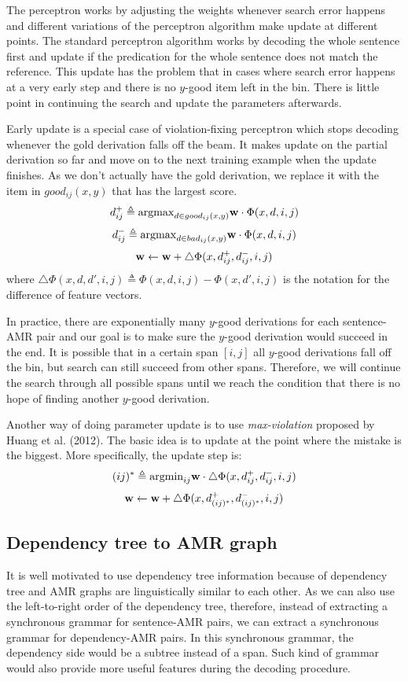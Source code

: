 The perceptron works by adjusting the weights whenever search error happens and different variations of the perceptron algorithm make update
at different points. The standard perceptron algorithm works by decoding the whole sentence first and update if the predication for the whole
sentence does not match the reference. This update has the problem that in cases where search error happens at a very early step and there is
no $y$-good item left in the bin. There is little point in continuing the search and update the parameters afterwards.


Early update is a special case of violation-fixing perceptron which stops decoding whenever the gold derivation falls off the beam. It makes update on the partial derivation so far and 
move on to the next training example when the update finishes. As we don't actually have the gold derivation, we replace it with
the item in $good_{ij}(x,y)$ that has the largest score.
$$d_{ij}^{+} \triangleq {\bf \argmax}_{d\in good_{ij}(x,y)} {\bf w}\cdot \Phi(x, d, i, j)$$
$$d_{ij}^{-} \triangleq {\bf \argmax}_{d\in bad_{ij}(x,y)} {\bf w}\cdot \Phi(x, d, i, j)$$
$${\bf w} \leftarrow {\bf w} + \triangle \Phi(x, d_{ij}^{+}, d_{ij}^{-}, i, j)$$
where $\triangle \Phi(x, d, d', i, j) \triangleq \Phi(x, d, i, j) - \Phi(x, d', i, j)$ is the notation for the difference of feature vectors.


In practice, there are exponentially many $y$-good derivations for each sentence-AMR pair and our goal is to make sure the $y$-good derivation would succeed in the end. 
It is possible that in a certain span $[i,j]$ all $y$-good derivations fall off the bin, but search can still succeed from other spans.
Therefore, we will continue the search through all possible spans until we reach the condition that there is no hope of finding another 
$y$-good derivation.


Another way of doing parameter update is to use \textit{max-violation} proposed by Huang et al. (2012). The basic idea is to update at the
point where the mistake is the biggest. More specifically, the update step is:
$$(ij)^{*} \triangleq {\argmin}_{ij} {\bf w} \cdot \triangle \Phi(x, d_{ij}^{+}, d_{ij}^{-}, i, j)$$
$${\bf w} \leftarrow {\bf w} + \triangle \Phi(x, d_{(ij)^*}^{+}, d_{(ij)^*}^{-}, i, j)$$

\subsection{Dependency tree to AMR graph}
It is well motivated to use dependency tree information because of dependency tree and AMR graphs are linguistically similar to each other.
As we can also use the left-to-right order of the dependency tree, therefore, instead of extracting a synchronous grammar for sentence-AMR pairs, we can
extract a synchronous grammar for dependency-AMR pairs.
In this synchronous grammar, the dependency side would be a subtree instead of a span. Such kind of grammar would also provide more useful features during the decoding procedure.
